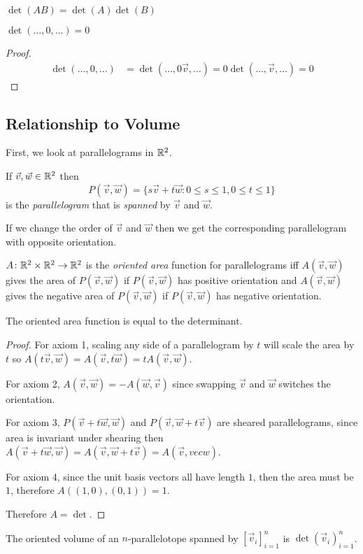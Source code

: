 \documentclass[notes]{subfiles}
\begin{document}
\begin{lemma}
    $\det(AB) = \det(A)\det(B)$
\end{lemma}

\begin{lemma}
    $\det(\ldots, 0, \ldots) = 0$
\end{lemma}
\begin{proof}
    \begin{align*}
        \det(\ldots, 0, \ldots)
        &= \det(\ldots, 0\vec{v}, \ldots)
        = 0\det(\ldots, \vec{v}, \ldots)
        = 0
    \end{align*}
\end{proof}

\subsection{Relationship to Volume}
First, we look at parallelograms in $\mathbb{R}^2$.

\begin{definition}[Parallelogram]
    If $\vec{v}, \vec{w} \in \mathbb{R}^2$ then
    \[
        P(\vec{v}, \vec{w}) = \{ s\vec{v} + t\vec{w} : 0 \leq s \leq 1, 0 \leq t \leq 1 \}
    \]
    is the \textit{parallelogram} that is \textit{spanned} by $\vec{v}$ and $\vec{w}$.
\end{definition}

If we change the order of $\vec{v}$ and $\vec{w}$ then we get the corresponding parallelogram with opposite orientation.

\begin{definition}
    $A\colon \mathbb{R}^2 \times \mathbb{R}^2 \to \mathbb{R}^2$ is the \textit{oriented area} function for parallelograms iff $A(\vec{v}, \vec{w})$ gives the area of $P(\vec{v}, \vec{w})$ if $P(\vec{v}, \vec{w})$ has positive orientation and $A(\vec{v}, \vec{w})$ gives the negative area of $P(\vec{v}, \vec{w})$ if $P(\vec{v}, \vec{w})$ has negative orientation.
\end{definition}

\begin{lemma}
    The oriented area function is equal to the determinant.
\end{lemma}
\begin{proof}
    For axiom 1, scaling any side of a parallelogram by $t$ will scale the area by $t$ so $A(t\vec{v}, \vec{w}) = A(\vec{v}, t\vec{w}) = tA(\vec{v}, \vec{w})$.

    For axiom 2, $A(\vec{v}, \vec{w}) = -A(\vec{w}, \vec{v})$ since swapping $\vec{v}$ and $\vec{w}$ switches the orientation.

    For axiom 3, $P(\vec{v} + t\vec{w}, \vec{w})$ and $P(\vec{v}, \vec{w} + t\vec{v})$ are sheared parallelograms, since area is invariant under shearing then $A(\vec{v} + t\vec{w}, \vec{w}) = A(\vec{v}, \vec{w} + t\vec{v}) = A(\vec{v},vec{w})$.

    For axiom 4, since the unit basis vectors all have length $1$, then the area must be $1$, therefore $A((1, 0), (0, 1)) = 1$.

    Therefore $A = \det$.
\end{proof}

\begin{theorem}
    The oriented volume of an $n$-parallelotope spanned by $[\vec{v}_i]_{i = 1}^n$ is $\det(\vec{v}_i)_{i = 1}^n$.
\end{theorem}
\end{document}
